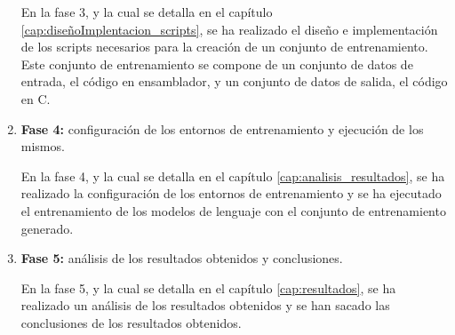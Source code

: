\begin{enumerate}
        En la fase 3, y la cual se detalla en el capítulo \ref{cap:diseñoImplentacion_scripts},
        se ha realizado el diseño e implementación de los scripts necesarios para la
        creación de un conjunto de entrenamiento. Este conjunto de entrenamiento se
        compone de un conjunto de datos de entrada, el código en ensamblador, y un conjunto
        de datos de salida, el código en C.

    \item \textbf{Fase 4:} configuración de los entornos de entrenamiento y ejecución de
        los mismos.
        
        En la fase 4, y la cual se detalla en el capítulo \ref{cap:analisis_resultados},
        se ha realizado la configuración de los entornos de entrenamiento y se ha ejecutado
        el entrenamiento de los modelos de lenguaje con el conjunto de entrenamiento generado.

    \item \textbf{Fase 5:} análisis de los resultados obtenidos y conclusiones.

        En la fase 5, y la cual se detalla en el capítulo \ref{cap:resultados},
        se ha realizado un análisis de los resultados obtenidos y se han sacado las conclusiones
        de los resultados obtenidos.
\end{enumerate}